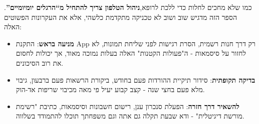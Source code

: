 
כמו שלא מחכים לחלות כדי ללכת לרופא,\textbf{ניהול הטלפון צריך להתחיל מ“הרגלים יומיומיים”}. הספר הזה מדגיש שוב ושוב לא טכניקה מתקדמת כלשהי, אלא את העקרונות הפשוטים האלה:

\begin{itemize}
  \item \textbf{מניעה בראש}: התקנת App רק דרך חנות רשמית, הסרת רגישות לפני שליחת תמונות, לא לחזור על סיסמאות - ה"פעולות הקטנות" האלה בעלות נמוכה מאוד, אך יכולות לחסום את רוב הסיכונים.
  \item \textbf{בדיקה תקופתית}: סידור תיקיית ההורדות פעם בחודש, ביקורת הרשאות פעם ברבעון, גיבוי מלא פעם בחצי שנה - קצב קבוע יעיל פי מאה מכיבוי שריפות אד-הוק.
  \item \textbf{להשאיר דרך חזרה}: הפעלת סנכרון ענן, רישום חשבונות וסיסמאות, כתיבת "רשימת מורשת דיגיטלית" - ודא שבעת תקלה גם אתה וגם משפחתך תוכלו להתמודד בשלווה.
\end{itemize}

